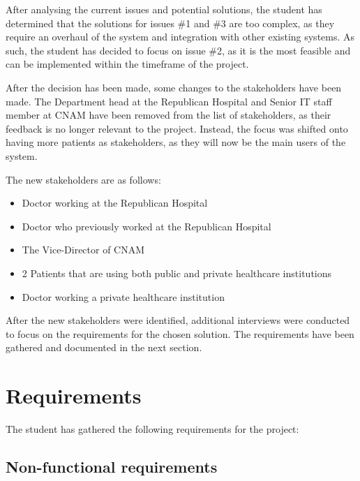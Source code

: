 After analysing the current issues and potential solutions, the student has determined that the solutions for issues \#1 and \#3 are too complex, as they require an overhaul of the system and integration with other existing systems. As such, the student has decided to focus on issue \#2, as it is the most feasible and can be implemented within the timeframe of the project. 

After the decision has been made, some changes to the stakeholders have been made. The Department head at the Republican Hospital and Senior IT staff member at CNAM have been removed from the list of stakeholders, as their feedback is no longer relevant to the project. Instead, the focus was shifted onto having more patients as stakeholders, as they will now be the main users of the system. 

The new stakeholders are as follows:
\begin{itemize}
    \item Doctor working at the Republican Hospital
    \item Doctor who previously worked at the Republican Hospital
    \item The Vice-Director of CNAM
    \item 2 Patients that are using both public and private healthcare institutions
    \item Doctor working a private healthcare institution
\end{itemize}

After the new stakeholders were identified, additional interviews were conducted to focus on the requirements for the chosen solution. The requirements have been gathered and documented in the next section.

\section{Requirements}

The student has gathered the following requirements for the project:

\subsection{Non-functional requirements}

